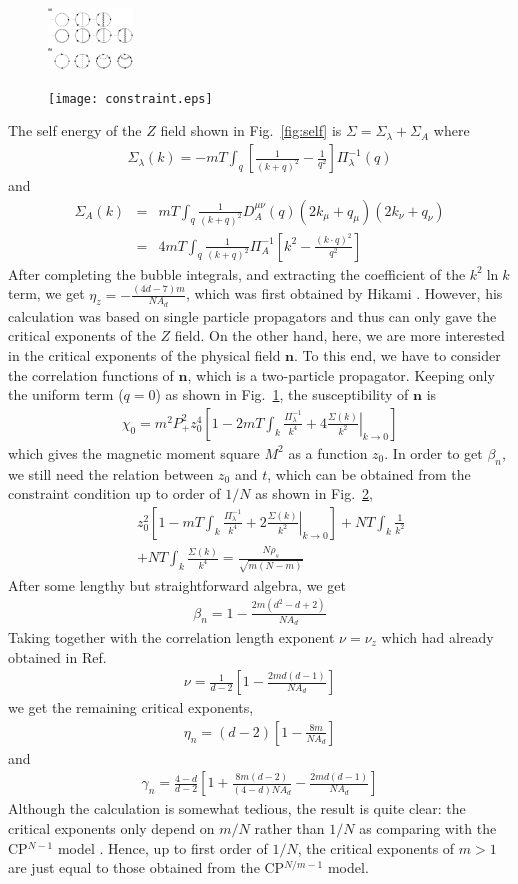 \documentclass[aps,twocolumn,superscriptaddress]{revtex4-1}
\newcommand{\bea}{\begin{eqnarray}}
\newcommand{\eea}{\end{eqnarray}}
\newcommand{\bn}{\mathbf{n}}
\begin{document}
\begin{figure}
  \includegraphics[width=0.2\textwidth]{suscept.eps}
  \caption{\label{fig:suscept}}
\end{figure}
\begin{figure}
  \texttt{[image: constraint.eps]}
  \caption{\label{fig:constraint}}
\end{figure}
The self energy of the $Z$ field shown in Fig.~\ref{fig:self} is $\Sigma=\Sigma_\lambda+\Sigma_A$ where
\bea \Sigma_\lambda(k)=-mT\int_q \left[\frac{1}{(k+q)^2}-\frac{1}{q^2}\right]\Pi_\lambda^{-1}(q) \eea
and
\bea \Sigma_A(k) &=& mT\int_q \frac{1}{(k+q)^2} D_A^{\mu\nu}(q) (2k_\mu+q_\mu) (2k_\nu+q_\nu) \nonumber \\&=& 4mT\int_q \frac{1}{(k+q)^2}\Pi_A^{-1}\left[ k^2-\frac{(k\cdot q)^2}{q^2} \right] \eea
After completing the bubble integrals, and extracting the coefficient of the $k^2\ln k$ term, we get $\eta_z=-\frac{(4d-7)m}{NA_d}$, which was first obtained by Hikami \cite{hikami1980}. However, his calculation was based on single particle propagators and thus can only gave the critical exponents of the $Z$ field. On the other hand, here, we are more interested in the critical exponents of the physical field $\bn$. To this end, we have to consider the correlation functions of $\bn$, which is a two-particle propagator. Keeping only the uniform term ($q=0$) as shown in Fig.~\ref{fig:suscept}, the susceptibility of $\bn$ is
\bea \chi_0=m^2P_+^2 z_0^4\left[ 1-  2mT\int_k \frac{\Pi_\lambda^{-1}}{k^4} + 4 \left.\frac{\Sigma(k)}{k^2}\right|_{k\rightarrow0} \right] \eea
  which gives the magnetic moment square $M^2$ as a function $z_0$. In order to get $\beta_n$, we still need the relation between $z_0$ and $t$, which can be obtained from the constraint condition up to order of $1/N$ as shown in Fig.~\ref{fig:constraint},
\bea &&z_0^2 \left[ 1-  mT\int_k \frac{\Pi_\lambda^{-1}}{k^4} + 2 \left.\frac{\Sigma(k)}{k^2}\right|_{k\rightarrow0}\right] + NT\int_k \frac{1}{k^2} \nonumber\\&&+ NT\int_k \frac{\Sigma(k)}{k^4} = \frac{N\rho_s}{\sqrt{m(N-m)}} \eea 
After some lengthy but straightforward algebra, we get 
\bea \beta_n=1-\frac{2m(d^2-d+2)}{NA_d} \eea
Taking together with the correlation length exponent $\nu=\nu_z$ which had already obtained in Ref.~\cite{hikami1980}
\bea \nu=\frac{1}{d-2}\left[ 1-\frac{2md(d-1)}{NA_d} \right] \eea
we get the remaining critical exponents,
\bea \eta_n=(d-2)\left[1-\frac{8m}{NA_d}\right] \eea
and
\bea \gamma_n=\frac{4-d}{d-2}\left[ 1+\frac{8m(d-2)}{(4-d)NA_d}-\frac{2md(d-1)}{NA_d} \right] \eea
Although the calculation is somewhat tedious, the result is quite clear: the critical exponents only depend on $m/N$ rather than $1/N$ as comparing with the CP$^{N-1}$ model \cite{irkhin1996}. Hence, up to first order of $1/N$, the critical exponents of $m>1$ are just equal to those obtained from the CP$^{N/m-1}$ model. 
\end{document}

